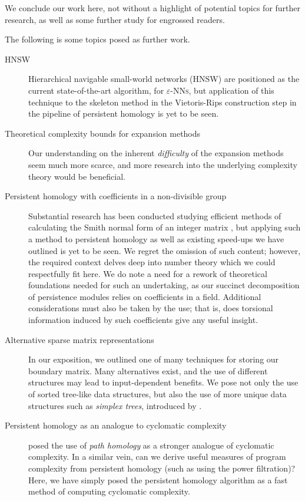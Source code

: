 We conclude our work here, not without a highlight of potential topics for further research, as well as some further study for engrossed readers.

The following is some topics posed as further work.

\begin{description}
    \item[HNSW] Hierarchical navigable small-world networks (HNSW) \cite{malkov2018efficient} are positioned as the current state-of-the-art algorithm, for \textsc{$\varepsilon$-NNs}, but application of this technique to the skeleton method in the Vietoris-Rips construction step in the pipeline of persistent homology is yet to be seen. 
    \item[Theoretical complexity bounds for expansion methods] Our understanding on the inherent \emph{difficulty} of the expansion methods seem much more scarce, and more research into the underlying complexity theory would be beneficial.
    \item[Persistent homology with coefficients in a non-divisible group] Substantial research has been conducted studying efficient methods of calculating the Smith normal form of an integer matrix \cite{havas1998extended}, but applying such a method to persistent homology as well as existing speed-ups we have outlined is yet to be seen. We regret the omission of such content; however, the required context delves deep into number theory which we could respectfully fit here. We do note a need for a rework of theoretical foundations needed for such an undertaking, as our succinct decomposition of persistence modules relies on coefficients in a field. Additional considerations must also be taken by the use; that is, does torsional information induced by such coefficients give any useful insight.
    \item[Alternative sparse matrix representations] In our exposition, we outlined one of many techniques for storing our boundary matrix. Many alternatives exist, and the use of different structures may lead to input-dependent benefits. We pose not only the use of sorted tree-like data structures, but also the use of more unique data structures such as \emph{simplex trees}, introduced by \cite{boissonnat2014simplex}.
    \item[Persistent homology as an analogue to cyclomatic complexity] \textcite{huntsman2020path} posed the use of \emph{path homology} as a stronger analogue of cyclomatic complexity. In a similar vein, can we derive useful measures of program complexity from persistent homology (such as using the power filtration)? Here, we have simply posed the persistent homology algorithm as a fast method of computing cyclomatic complexity. 

\end{description}
